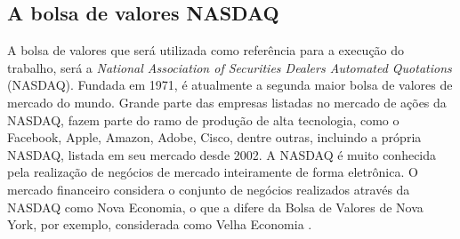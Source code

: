 \subsection{A bolsa de valores NASDAQ}
A bolsa de valores que será utilizada como referência para a execução do trabalho, será a  \textit{National Association of Securities Dealers Automated Quotations} (NASDAQ). Fundada em 1971, é atualmente a segunda maior bolsa de valores de mercado do mundo. Grande parte das empresas listadas no mercado de ações da NASDAQ, fazem parte do ramo de produção de alta tecnologia, como o Facebook, Apple, Amazon, Adobe, Cisco, dentre outras, incluindo a própria NASDAQ, listada em seu mercado desde 2002. 
A NASDAQ é muito conhecida pela realização de negócios de mercado inteiramente de forma eletrônica. O mercado financeiro considera o conjunto de negócios realizados através da NASDAQ como Nova Economia, o que a difere da Bolsa de Valores de Nova York, por exemplo, considerada como Velha Economia \cite{christie}.

